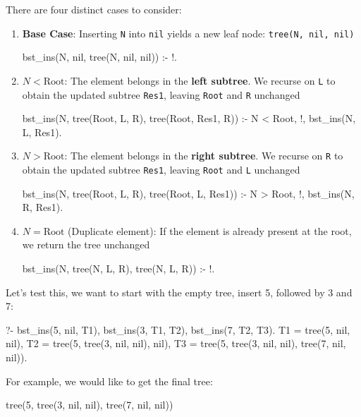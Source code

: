 There are four distinct cases to consider:
\begin{enumerate}
    \item \textbf{Base Case}: 
    Inserting \texttt{N} into \texttt{nil} yields a new leaf node: \texttt{tree(N, nil, nil)}
    \begin{codeblock}
    bst_ins(N, nil, tree(N, nil, nil)) :- !.
    \end{codeblock}
    \item $N < \text{Root}$:
    The element belongs in the \textbf{left subtree}. We recurse on \texttt{L} to obtain the updated subtree \texttt{Res1}, leaving \texttt{Root} and \texttt{R} unchanged
    \begin{codeblock}
    bst_ins(N, tree(Root, L, R), tree(Root, Res1, R)) :- 
        N < Root, !,
        bst_ins(N, L, Res1).
    \end{codeblock}
    \item $N > \text{Root}$:
    The element belongs in the \textbf{right subtree}. We recurse on \texttt{R} to obtain the updated subtree \texttt{Res1}, leaving \texttt{Root} and \texttt{L} unchanged
    \begin{codeblock}
    bst_ins(N, tree(Root, L, R), tree(Root, L, Res1)) :- 
        N > Root, !,
        bst_ins(N, R, Res1).
    \end{codeblock}
    \item $N = \text{Root}$ (Duplicate element): 
    If the element is already present at the root, we return the tree unchanged
    \begin{codeblock}
    bst_ins(N, tree(N, L, R), tree(N, L, R)) :- !.
    \end{codeblock}
\end{enumerate}

Let's test this, we want to start with the empty tree, insert 5, followed by 3 and 7:
\begin{codeblock}
?- bst_ins(5, nil, T1), bst_ins(3, T1, T2), bst_ins(7, T2, T3).
T1 = tree(5, nil, nil),
T2 = tree(5, tree(3, nil, nil), nil),
T3 = tree(5, tree(3, nil, nil), tree(7, nil, nil)).
\end{codeblock}



For example, we would like to get the final tree:
\begin{codeblock}
tree(5, tree(3, nil, nil), tree(7, nil, nil))
\end{codeblock}

